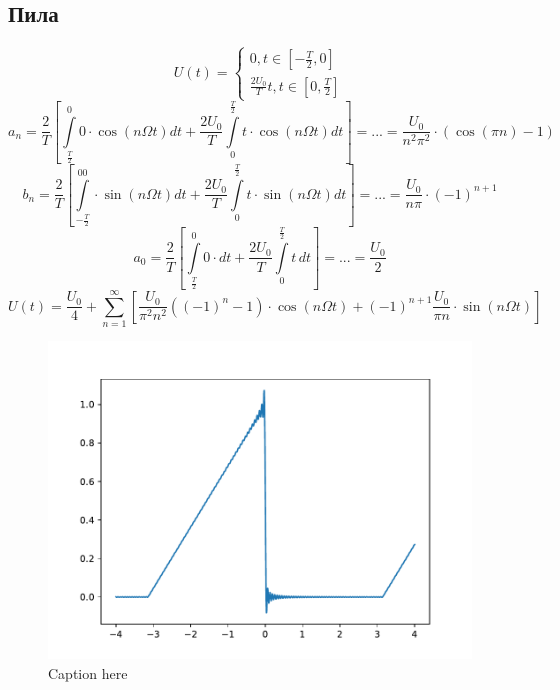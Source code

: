 \subsection{Пила}
\begin{equation}
	U(t)=\left\{
	\begin{aligned}
		0, t\in [-\frac{T}{2},0]\\
		\frac{2U_0}{T}t, t\in[0, \frac{T}{2}]
	\end{aligned}
	\right.
\end{equation}
\begin{equation}
	a_n=\frac{2}{T}\left[\int\limits_{\frac{T}{2}}^0 0\cdot\cos{(n\Omega t)} dt+\frac{2U_0}{T}\int\limits_0^{\frac{T}{2}}t\cdot\cos(n\Omega t)dt \right]=...=\frac{U_0}{n^2\pi^2}\cdot(\cos(\pi n)-1)
\end{equation}
\begin{equation}
	b_n=\frac{2}{T}\left[\int\limits_{-\frac{T}{2}}^00\cdot\sin(n\Omega t)dt + \frac{2U_0}{T}\int\limits_0^{\frac{T}{2}}t\cdot\sin(n\Omega t)dt\right]=...=\frac{U_0}{n\pi}\cdot(-1)^{n+1}
\end{equation}
\begin{equation}
	a_0=\frac{2}{T}\left[\int\limits_{\frac{T}{2}}^0 0\cdot dt+\frac{2U_0}{T}\int\limits_0^{\frac{T}{2}}t \,dt \right]=...=\frac{U_0}{2}
\end{equation}
\begin{equation}
	U(t)=\frac{U_0}{4}+\sum_{n=1}^{\infty}\left[\frac{U_0}{\pi^2n^2}\left((-1)^n-1\right)\cdot\cos(n\Omega t)+ (-1)^{n+1}\frac{U_0}{\pi n}\cdot\sin(n\Omega t)\right]
\end{equation}
\begin{figure}[tb]
	\centering
	\includegraphics[]{plot/pila}
	\caption{Caption here}
	\label{fig:figure1}
\end{figure}
